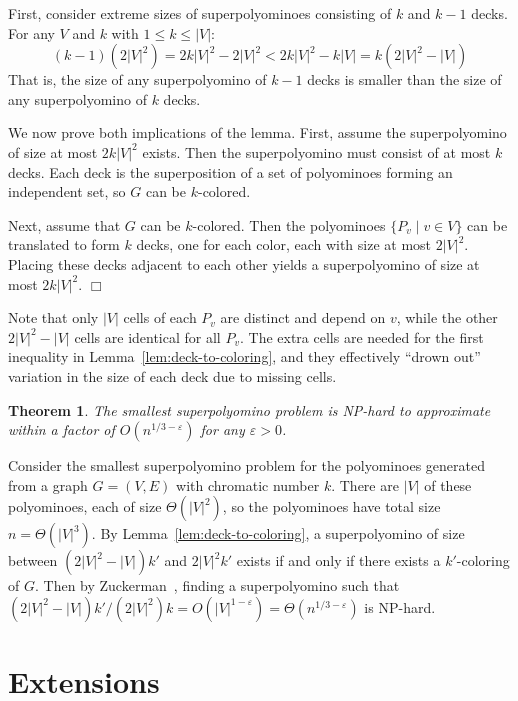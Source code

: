 \documentclass{article}
\newtheorem{theorem}{Theorem}[section]
\newenvironment{proof}[1][Proof]{\begin{trivlist}
\item[\hskip \labelsep {\bfseries #1}]}{\end{trivlist}}
\newcommand{\ccNP}{\textrm{\textsc{NP}}}
\newcommand{\qed}{\hfill \ensuremath{\Box}}
\begin{document}
\begin{proof}
First, consider extreme sizes of superpolyominoes consisting of $k$ and $k-1$ decks.
For any $V$ and $k$ with $1 \leq k \leq |V|$: 
$$(k-1)(2|V|^2) = 2k|V|^2 - 2|V|^2 < 2k|V|^2 - k|V| = k(2|V|^2 - |V|)$$
That is, the size of any superpolyomino of $k-1$ decks is smaller than the size of any superpolyomino of $k$ decks.

We now prove both implications of the lemma.
First, assume the superpolyomino of size at most $2k|V|^2$ exists.
Then the superpolyomino must consist of at most $k$ decks.
Each deck is the superposition of a set of polyominoes forming an independent set, so $G$ can be $k$-colored.

Next, assume that $G$ can be $k$-colored.
Then the polyominoes $\{P_v \mid v \in V\}$ can be translated to form $k$ decks, one for each color, each with size at most $2|V|^2$.
Placing these decks adjacent to each other yields a superpolyomino of size at most $2k|V|^2$.
\qed
\end{proof}

Note that only $|V|$ cells of each $P_v$ are distinct and depend on $v$, while the other $2|V|^2-|V|$ cells are identical for all $P_v$.
The extra cells are needed for the first inequality in Lemma~\ref{lem:deck-to-coloring}, and they effectively ``drown out'' variation in the size of each deck due to missing cells.

\begin{theorem}
\label{thm:ssp-inapprox}
The smallest superpolyomino problem is \ccNP-hard to approximate within a factor of $O(n^{1/3 - \varepsilon})$ for any $\varepsilon > 0$.
\end{theorem}

\begin{proof}
Consider the smallest superpolyomino problem for the polyominoes generated from a graph $G = (V, E)$ with chromatic number $k$.
There are $|V|$ of these polyominoes, each of size $\Theta(|V|^2)$, so the polyominoes have total size $n = \Theta(|V|^3)$.
By Lemma~\ref{lem:deck-to-coloring}, a superpolyomino of size between $(2|V|^2-|V|)k'$ and $2|V|^2k'$ exists if and only if there exists a $k'$-coloring of $G$.
Then by Zuckerman~\cite{Zuckerman-2007}, finding a superpolyomino such that $(2|V|^2-|V|)k'/(2|V|^2)k = O(|V|^{1-\varepsilon}) = \Theta(n^{1/3-\varepsilon})$ is \ccNP-hard.
\end{proof}

\section{Extensions}
\end{document}
